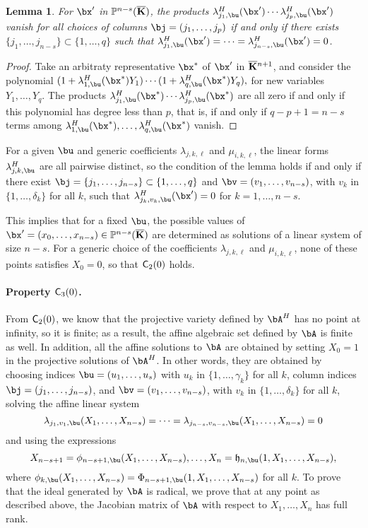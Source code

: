 \documentclass[12pt]{article}
\newtheorem{lemma}[definition]{Lemma}
\begin{document}
\begin{lemma}
  For $\bx'$ in $\mathbb{P}^{n-s}(\overline{\mathbf{K}})$, the products
  $\lambda^H_{j_1,\bu}(\bx')\cdots \lambda^H_{j_p,\bu}(\bx')$
  vanish for all choices of columns $\bj=(j_1,\dots,j_p)$ if and only
  if there exists $\{j_1,\dots,j_{n-s}\} \subset \{1,\dots,q\}$ such 
  that $\lambda^H_{j_1,\bu}(\bx')=\cdots=\lambda^H_{j_{n-s},\bu}(\bx')=0$.
\end{lemma}
\begin{proof}
  Take an arbitraty representative $\bx^*$ of $\bx'$ in
  $\overline{\mathbf{K}}{}^{n+1}$, and consider the polynomial 
  $(1+\lambda^H_{1,\bu}(\bx^*)Y_1) \cdots (1+\lambda^H_{q,\bu}(\bx^*)Y_q),$
  for new variables $Y_1,\dots,Y_q$. The products
  $\lambda^H_{j_1,\bu}(\bx^*)\cdots \lambda^H_{j_p,\bu}(\bx^*)$ are all zero
  if and only if this polynomial has degree less than $p$, that is, if
  and only if $q-p+1=n-s$ terms among
  $\lambda^H_{1,\bu}(\bx^*),\dots,\lambda^H_{q,\bu}(\bx^*)$ vanish.
\end{proof}


For a given $\bu$ and generic coefficients $\lambda_{j,k,\ell}$ and $\mu_{i,k,\ell}$,
 the linear forms $\lambda^H_{j,k,\bu}$ are all pairwise distinct, so
the condition of the lemma holds if and only if there exist
$\bj=\{j_1,\dots,j_{n-s}\} \subset \{1,\dots,q\}$ and
$\bv=(v_1,\dots,v_{n-s})$, with $v_k$ in $\{1,\dots,\delta_k\}$ for all
$k$, such that $\lambda^H_{j_k,v_k,\bu}(\bx')=0$ 
for $k=1,\dots,n-s$.

This implies that for a fixed $\bu$, the possible values of $\bx'=(x_0,\dots,x_{n-s}) \in \P^{n-s}(\KKbar)$ are
determined as solutions of a linear system of size $n-s$. For a
generic choice of the coefficients $\lambda_{j,k,\ell}$ and
$\mu_{i,k,\ell}$, none of these points satisfies $X_0=0$, so that
$\mathsf{C}_2(0)$ holds.

\paragraph{Property $\mathsf{C}_3(0)$.} From $\mathsf{C}_2(0)$, we know that
the projective variety defined by $\bA^\mH$ has no point at infinity,
so it is finite; as a result, the affine algebraic set defined by
$\bA$ is finite as well. In addition, all the affine solutions to
$\bA$ are obtained by setting $X_0=1$ in the projective solutions of
$\bA^\mH$. In other words, they are obtained by choosing indices
$\bu=(u_1,\dots,u_s)$ with $u_k$ in $\{1,\dots,\gamma_k\}$ for all $k$,
column indices $\bj=(j_1,\dots,j_{n-s})$, and
$\bv=(v_1,\dots,v_{n-s})$, with $v_k$ in $\{1,\dots,\delta_k\}$
for all $k$, solving the affine linear system
$$\lambda_{j_1,v_1,\bu}(X_1,\dots,X_{n-s})=\cdots=\lambda_{j_{n-s},v_{n-s},\bu}(X_1,\dots,X_{n-s})=0$$ 
and using the expressions
$$X_{n-s+1}=\phi_{n-s+1,\bu}(X_1,\dots,X_{n-s}),\dots,X_{n}=\mathfrak{h}_{n,\bu}(1,X_1,\dots,X_{n-s}),$$
where $\phi_{k,\bu}(X_1,\dots,X_{n-s})=\Phi_{n-s+1,\bu}(1,X_1,\dots,X_{n-s})$
for all $k$.
To prove that the ideal generated by $\bA$ is radical, we prove that
at any point as described above, the Jacobian matrix of $\bA$ with
respect to $X_1,\dots,X_n$ has full rank.
\end{document}
